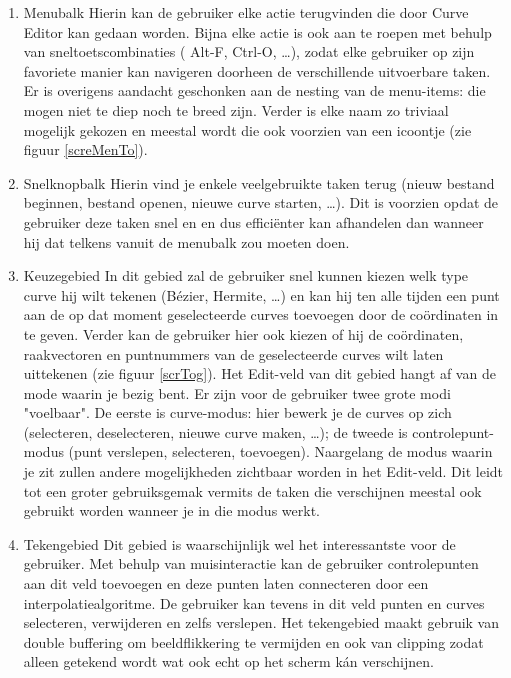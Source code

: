 \documentclass[a4paper,11pt,oneside, titlepage]{article}
\begin{document}
\begin{enumerate}
\item Menubalk\newline
Hierin kan de gebruiker elke actie terugvinden die door Curve Editor kan gedaan worden.
Bijna elke actie is ook aan te roepen met behulp van sneltoetscombinaties ( Alt-F, Ctrl-O, \ldots ), zodat
elke gebruiker op zijn favoriete manier kan navigeren doorheen de verschillende uitvoerbare taken.
Er is overigens aandacht geschonken aan de nesting van de menu-items: die mogen niet te diep noch te breed zijn.
Verder is elke naam zo triviaal mogelijk gekozen en meestal wordt die ook voorzien van een icoontje (zie figuur \ref{screMenTo}).
\item Snelknopbalk
Hierin vind je enkele veelgebruikte taken terug (nieuw bestand beginnen, bestand openen, 
nieuwe curve starten, \ldots). Dit is voorzien opdat de gebruiker deze taken snel en en dus effici\"enter kan
afhandelen dan wanneer hij dat telkens vanuit de menubalk zou moeten doen.
\item Keuzegebied\newline
In dit gebied zal de gebruiker snel kunnen kiezen welk type curve hij wilt tekenen (B\'ezier, 
Hermite, \ldots) en kan hij ten alle tijden een punt aan de op dat moment geselecteerde curves toevoegen door 
de co\"ordinaten in te geven. Verder kan de gebruiker hier ook kiezen of hij de co\"ordinaten, raakvectoren en 
puntnummers van de geselecteerde curves wilt laten uittekenen (zie figuur \ref{scrTog}). \newline
Het Edit-veld van dit gebied hangt af van de mode waarin je bezig bent. Er zijn voor de gebruiker
twee grote modi "voelbaar". De eerste is curve-modus: hier bewerk je de curves op zich (selecteren, 
deselecteren, nieuwe curve maken, \ldots); de tweede is controlepunt-modus (punt verslepen, selecteren, toevoegen).
Naargelang de modus waarin je zit zullen andere mogelijkheden zichtbaar worden in het Edit-veld.
Dit leidt tot een groter gebruiksgemak vermits de taken die verschijnen meestal ook gebruikt
worden wanneer je in die modus werkt.
\item Tekengebied\newline
Dit gebied is waarschijnlijk wel het interessantste voor de gebruiker. Met behulp van muisinteractie
kan de gebruiker controlepunten aan dit veld toevoegen en deze punten laten connecteren
door een interpolatiealgoritme. De gebruiker kan tevens in dit veld punten en curves selecteren,
verwijderen en zelfs verslepen. Het tekengebied maakt gebruik van double buffering om 
beeldflikkering te vermijden en ook van clipping zodat alleen getekend wordt wat ook echt
op het scherm k\'an verschijnen.
\end{enumerate}
\end{document}
